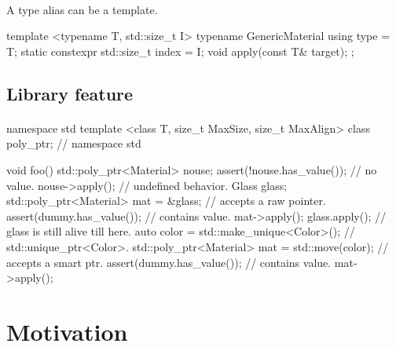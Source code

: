 \documentclass{article}
\begin{document}
\paragraph{}
A type alias can be a template.
\begin{codeblock}
template <typename T, std::size_t I>
typename GenericMaterial {
  using type = T;
  static constexpr std::size_t index = I;
  void apply(const T& target);
};
\end{codeblock}

\subsection{Library feature}
\paragraph{}
\begin{codeblock}
namespace std {
template <class T, size_t MaxSize, size_t MaxAlign>
class poly_ptr;
} // namespace std

void foo() {
  {
    std::poly_ptr<Material> nouse;
    assert(!nouse.has_value()); // no value.
    nouse->apply(); // undefined behavior.
  }
  {
    Glass glass;
    {
      std::poly_ptr<Material> mat = &glass; // accepts a raw pointer.
      assert(dummy.has_value()); // contains value.
      mat->apply();
    }
    glass.apply(); // glass is still alive till here.
  }
  {
    auto color = std::make_unique<Color>(); // std::unique\_ptr\textless Color\textgreater.
    std::poly_ptr<Material> mat = std::move(color); // accepts a smart ptr.
    assert(dummy.has_value()); // contains value.
    mat->apply();
  }
}
\end{codeblock}

\section{Motivation}
\end{document}
